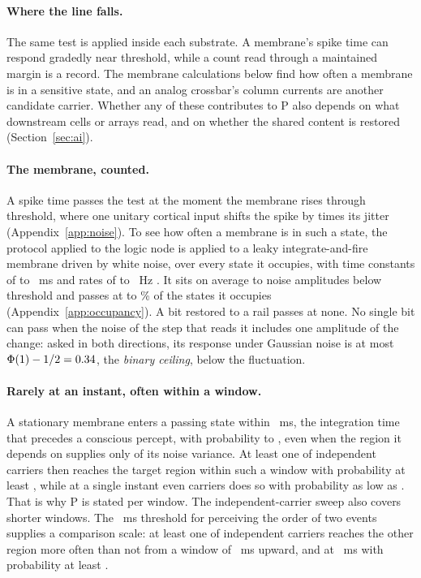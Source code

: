 \documentclass[12pt]{article}
\begin{document}
\paragraph{Where the line falls.} The same test is applied inside each
substrate. A membrane's spike time can respond gradedly near threshold, while a
count read through a maintained margin is a record. The membrane calculations
below find how often a membrane is in a sensitive state, and an analog
crossbar's column currents are another candidate carrier. Whether any of these
contributes to P also depends on what downstream cells or arrays read, and on
whether the shared content is restored (Section~\ref{sec:ai}).

\paragraph{The membrane, counted.} A spike time passes the test at the moment
the membrane rises through threshold, where one unitary cortical input shifts
the spike by \ueCorticalShiftToJitter{} times its jitter
(Appendix~\ref{app:noise}). To see how often a membrane is in such a state, the
protocol applied to the logic node is applied to a leaky integrate-and-fire
membrane driven by white noise, over every state it occupies, with time
constants of \uOccTauFast{} to \uOccTauSlow{}~ms
\citep{destexhe1999,destexhe2003} and rates of \uOccRateLow{} to
\uOccRateHigh{}~Hz \citep{hromadka2008}. It sits on average \uOccDistanceMin{} to
\uOccDistanceMax{} noise amplitudes below threshold and passes at
\uOccPassMinPercent{} to \uOccPassMaxPercent\% of the states it occupies
(Appendix~\ref{app:occupancy}). A bit restored to a rail passes at none. No single
bit can pass when the noise of the step that reads it includes one amplitude of
the change: asked in both directions, its response under Gaussian noise is at
most $\Phi(1)-1/2=0.34$, the \emph{binary ceiling}, below the
fluctuation.

\paragraph{Rarely at an instant, often within a window.} A stationary membrane
enters a passing state within \uOccContentLongMs{}~ms, the integration time that
precedes a conscious percept, with probability \uOccHitMinLong{} to
\uOccHitMaxLong{}, even when the region it depends on supplies only
\uOccShareMin{} of its noise variance. At least one of \uOccCarriersFew{} independent
carriers then reaches the target region within such a window with probability at least
\uOccLinkFewLong{}, while at a single instant even \uOccCarriersMany{} carriers
does so with probability as low as \uOccInstantLinkMin{}. That is why P is
stated per window. The independent-carrier sweep also covers shorter windows.
The \uWinPerceptMs{}~ms threshold for perceiving the order of two events
\citep{hirsh1961} supplies a comparison scale: at least one of
\uOccCarriersMany{} independent carriers reaches the other region more often
than not from a window of \uWinLowManyMs{}~ms upward, and at
\uWinPerceptMs{}~ms with probability at least \uWinLinkPercept{}.
\end{document}
